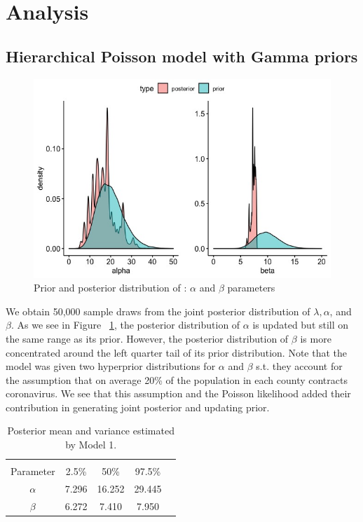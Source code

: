 \documentclass[11pt,twocolumn]{asaproc}
\begin{document}
\section{Analysis}

\subsection{Hierarchical Poisson model with Gamma priors}

\begin{figure}[t]
\centering\includegraphics[scale=.30]{prior_post.jpeg}
\caption{Prior and posterior distribution of : $\alpha$ and $\beta$ parameters}
\label{fig:priorpost}
\end{figure}


We obtain 50,000 sample draws from the joint posterior distribution of $\lambda, \alpha$, and $\beta$. As we see in Figure ~\ref{fig:priorpost}, the posterior distribution of $\alpha$ is updated but still on the same range as its prior. However, the posterior distribution of $\beta$ is more concentrated around the left quarter tail of its prior distribution. Note that the model was given two hyperprior distributions for $\alpha$ and $\beta$ s.t. they account for the assumption that on average 20\% of the population in each county contracts coronavirus. We see that this assumption and the Poisson likelihood added their contribution in generating joint posterior and updating prior. 

\begin{table}
\caption{Posterior mean and variance estimated by Model 1.}
\label{tab:fmodelest}
\begin{center}
\begin{tabular}{ccccc}
\hline
\hline
\\[-5pt]
\multicolumn{1}{c}{Parameter} &
\multicolumn{1}{c}{2.5\%} &
\multicolumn{1}{c}{50\%} &
\multicolumn{1}{c}{97.5\%}\\
\hline
$\alpha$&     7.296&	16.252&  29.445\\
$\beta$&     6.272&    7.410&  7.950\\
\hline
\end{tabular}
\end{center}
\end{table}
\end{document}
